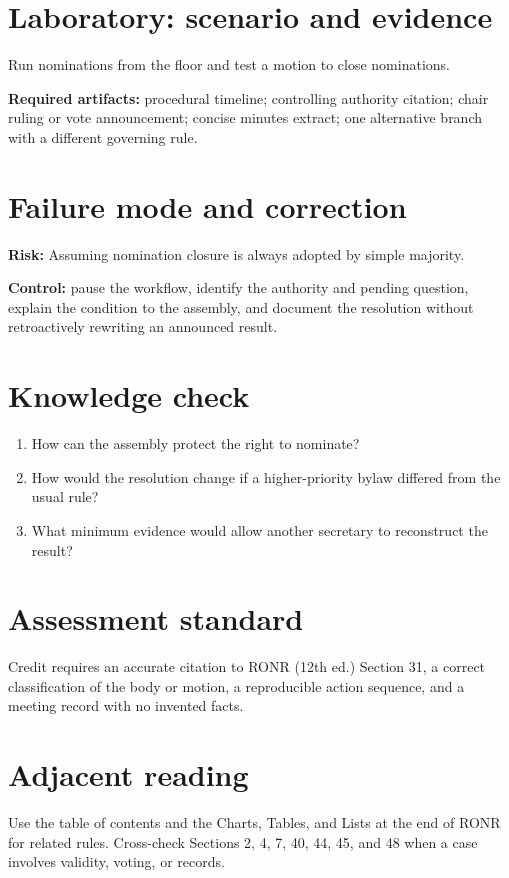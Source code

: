 \documentclass[11pt]{article}
\begin{document}
\section{Laboratory: scenario and evidence}
Run nominations from the floor and test a motion to close nominations.

\textbf{Required artifacts:} procedural timeline; controlling authority citation; chair ruling or vote announcement; concise minutes extract; one alternative branch with a different governing rule.

\section{Failure mode and correction}
\textbf{Risk:} Assuming nomination closure is always adopted by simple majority.

\textbf{Control:} pause the workflow, identify the authority and pending question, explain the condition to the assembly, and document the resolution without retroactively rewriting an announced result.

\section{Knowledge check}
\begin{enumerate}[leftmargin=*,itemsep=4pt]
\item How can the assembly protect the right to nominate?
\item How would the resolution change if a higher-priority bylaw differed from the usual rule?
\item What minimum evidence would allow another secretary to reconstruct the result?
\end{enumerate}

\section{Assessment standard}
Credit requires an accurate citation to RONR (12th ed.) Section 31, a correct classification of the body or motion, a reproducible action sequence, and a meeting record with no invented facts.

\section{Adjacent reading}
Use the table of contents and the Charts, Tables, and Lists at the end of RONR for related rules. Cross-check Sections 2, 4, 7, 40, 44, 45, and 48 when a case involves validity, voting, or records.
\end{document}
